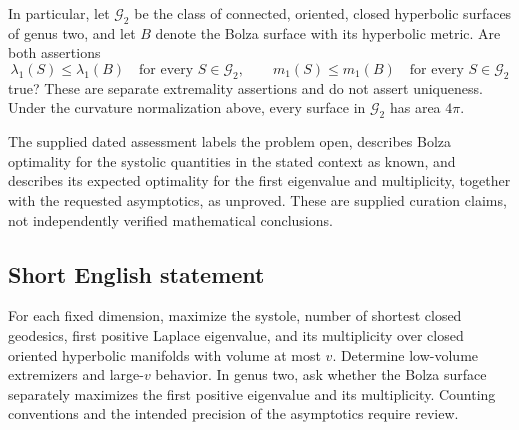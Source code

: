 \documentclass[11pt]{article}
\begin{document}
In particular, let \(\mathcal G_2\) be the class of connected, oriented, closed hyperbolic surfaces of genus two, and let \(B\) denote the Bolza surface with its hyperbolic metric. Are both assertions
\[
\lambda_1(S)\leq\lambda_1(B)\quad\text{for every }S\in\mathcal G_2,
\qquad
m_1(S)\leq m_1(B)\quad\text{for every }S\in\mathcal G_2
\]
true? These are separate extremality assertions and do not assert uniqueness. Under the curvature normalization above, every surface in \(\mathcal G_2\) has area \(4\pi\).

The supplied dated assessment labels the problem open, describes Bolza optimality for the systolic quantities in the stated context as known, and describes its expected optimality for the first eigenvalue and multiplicity, together with the requested asymptotics, as unproved. These are supplied curation claims, not independently verified mathematical conclusions.
\subsection{Short English statement}
For each fixed dimension, maximize the systole, number of shortest closed geodesics, first positive Laplace eigenvalue, and its multiplicity over closed oriented hyperbolic manifolds with volume at most \(v\). Determine low-volume extremizers and large-\(v\) behavior. In genus two, ask whether the Bolza surface separately maximizes the first positive eigenvalue and its multiplicity. Counting conventions and the intended precision of the asymptotics require review.
\end{document}
